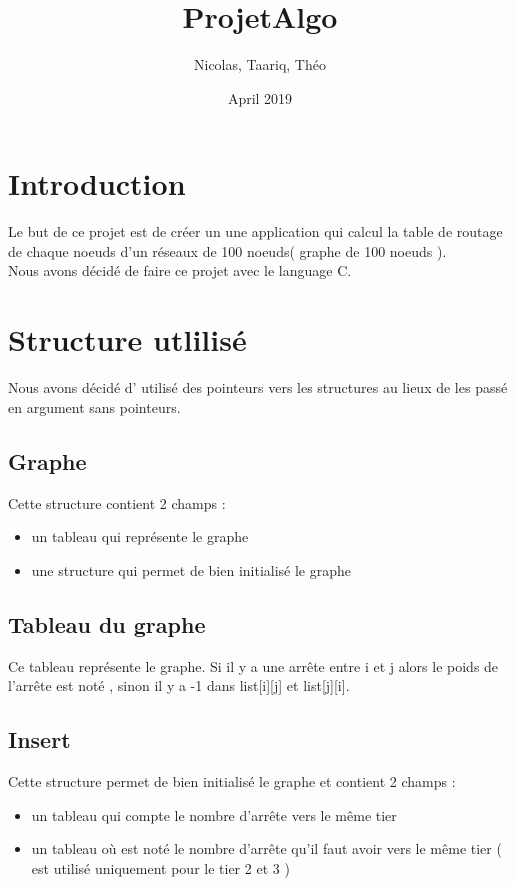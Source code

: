 \documentclass{article}
\title{ProjetAlgo}
\author{Nicolas, Taariq, Théo}
\date{April 2019}
\begin{document}
\maketitle

\section{Introduction}

Le but de ce projet est de créer un une application qui calcul la table de routage de chaque noeuds d'un réseaux de 100 noeuds( graphe de 100 noeuds ). 
\\Nous avons décidé de faire ce projet avec le language C.

\section{Structure utlilisé}

Nous avons décidé d' utilisé des pointeurs vers les structures au lieux de les passé en argument sans pointeurs.

\subsection{Graphe}

Cette structure contient 2 champs :
\begin{itemize}
    \item un tableau qui représente le graphe
    \item une structure qui permet de bien initialisé le graphe
\end{itemize}

\subsection{Tableau du graphe}

Ce tableau représente le graphe. Si il y a une arrête entre i et j alors le poids de l'arrête est noté , sinon il y a -1 dans list[i][j] et list[j][i].

\subsection{Insert}

Cette structure permet de bien initialisé le graphe et contient 2 champs :
\begin{itemize}
    \item un tableau qui compte le nombre d'arrête vers le même tier
    \item un tableau où est noté le nombre d'arrête qu'il faut avoir vers le même tier ( est utilisé uniquement pour le tier 2 et 3 )
\end{itemize}
\end{document}
